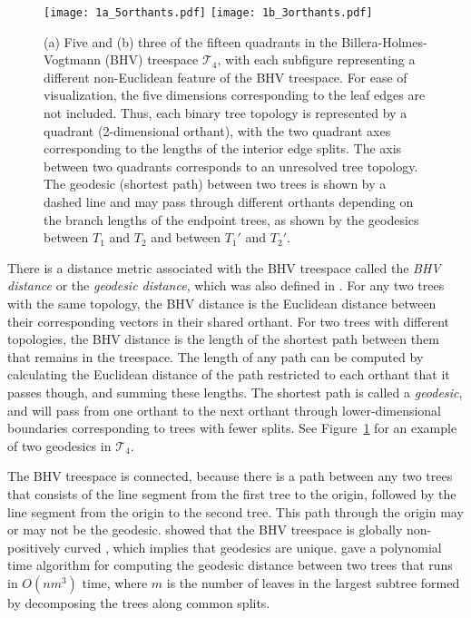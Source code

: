\documentclass[12pt,letterpaper]{article}
\theoremstyle{plain}
\theoremstyle{definition}
\newcommand\cT{\mathcal{T}}
\begin{document}
\begin{figure}[htb]
	\centering
	\texttt{[image: 1a\_5orthants.pdf]}   
	\texttt{[image: 1b\_3orthants.pdf]}
    \caption{(a) Five and (b) three of the fifteen quadrants in the Billera-Holmes-Vogtmann (BHV) treespace $\cT_4$, with each subfigure representing a different non-Euclidean feature of the BHV treespace.  For ease of visualization, the five dimensions corresponding to the leaf edges are not included. Thus, each binary tree topology is represented by a quadrant (2-dimensional orthant), with the two quadrant axes corresponding to the lengths of the interior edge splits. The axis between two quadrants corresponds to an unresolved tree topology.  The geodesic (shortest path) between two trees is shown by a dashed line and may pass through different orthants depending on the branch lengths of the endpoint trees, as shown by the geodesics between $T_1$ and $T_2$ and between $T_1'$ and $T_2'$.}  
    	\label{fig:5orthants}
\end{figure}

There is a distance metric associated with the BHV treespace called the \emph{BHV distance} or the \emph{geodesic distance}, which was also defined in \citet{BHV01}.  For any two trees with the same topology, the BHV distance is the Euclidean distance between their corresponding vectors in their shared orthant.  For two trees with different topologies, the BHV distance is the length of the shortest path between them that remains in the treespace. The length of any path can be computed by calculating the Euclidean distance of the path restricted to each orthant that it passes though, and summing these lengths. The shortest path is called a \emph{geodesic}, and will pass from one orthant to the next orthant through lower-dimensional boundaries corresponding to trees with fewer splits.  See Figure~\ref{fig:5orthants} for an example of two geodesics in $\cT_4$.

The BHV treespace is connected, because there is a path between any two trees that consists of the line segment from the first tree to the origin, followed by the line segment from the origin to the second tree.  This path through the origin may or may not be the geodesic.  \citet{BHV01} showed that the BHV treespace is globally non-positively curved \citep{BH99}, which implies that geodesics are unique.  \citet{OP11} gave a polynomial time algorithm for computing the geodesic distance between two trees that runs in $O(nm^3)$ time, where $m$ is the number of leaves in the largest subtree formed by decomposing the trees along common splits.
\end{document}
